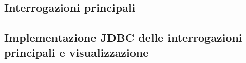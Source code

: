 \documentclass[a4paper]{scrartcl}
\begin{document}
\subsection*{\color[RGB]{155,0,20}Interrogazioni principali}


\subsection*{\color[RGB]{155,0,20}Implementazione JDBC delle interrogazioni principali e visualizzazione}

\end{document}
